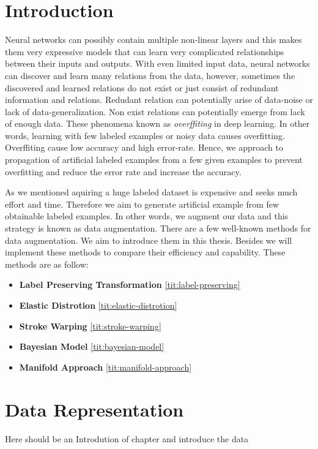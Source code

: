 \chapter{Introduction}

Neural networks can possibly contain multiple non-linear layers and this makes them very expressive models
that can learn very complicated relationships between their inputs and outputs. With even limited
input data, neural networks can discover and learn many relations from the data, however, sometimes the
discovered and learned relations do not exist or just consist of redundant information and
relations. Redudant relation can potentially arise of data-noise or lack of data-generalization. Non
exist relations can potentially emerge from lack of enough data. These phenomena known as
\textit{overffiting} in deep learning. In other words, learning with few labeled examples or noisy
data causes overfitting. Overffiting cause low accuracy and high error-rate. Hence, we approach to propagation of artificial
labeled examples from a few given examples to prevent overfitting and reduce the error rate and increase
the accuracy.

As we mentioned aquiring a huge labeled dataset is expensive and seeks much effort and time. Therefore we aim to generate artificial example from few obtainable labeled examples. In other words, we
augment our data and this strategy is known as data augmentation. There are a few well-known methods for data augmentation. We aim to introduce them in this thesis.  Besides we will implement these
methods to compare their efficiency and capability. These methods are as follow:
\begin{itemize}
  \item \textbf{Label Preserving Transformation} \ref{tit:label-preserving}
  \item \textbf{Elastic Distrotion} \ref{tit:elastic-distrotion}
  \item \textbf{Stroke Warping} \ref{tit:stroke-warping}
  \item \textbf{Bayesian Model} \ref{tit:bayesian-model}
  \item \textbf{Manifold Approach} \ref{tit:manifold-approach}
\end{itemize}



\chapter{Data Representation}
Here should be an Introdution of chapter and introduce the data


